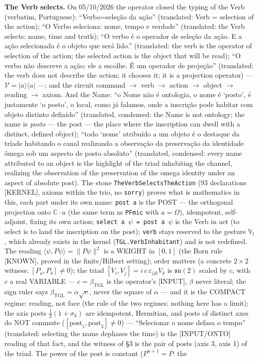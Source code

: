 \documentclass[11pt]{article}
\theoremstyle{definition}\newtheorem{deriv}{Derivation}
\begin{document}

\textbf{The Verb selects.} On 05/10/2026 the operator closed the typing of the Verb (verbatim, Portuguese): ``Verbo=seleção da ação'' (translated: Verb = selection of the action); ``O Verbo seleciona: nome, tempo e verdade'' (translated: the Verb selects: name, time and truth); ``O verbo é o operador de seleção da ação. E a ação selecionada é o objeto que será lido.'' (translated: the verb is the operator of selection of the action; the selected action is the object that will be read); ``O verbo não descreve a ação; ele a escolhe. É um operador de projeção'' (translated: the verb does not describe the action; it chooses it; it is a projection operator) --- $\mathcal V=|a\rangle\langle a|$ ---; and the circuit command $\to$ verb $\to$ action $\to$ object $\to$ reading $\to$ axiom. And the Name: ``o Nome não é ontologia, o nome é `posto', é justamente `o posto', o local, como já falamos, onde a inscrição pode habitar com objeto distinto definido'' (translated, condensed: the Name is not ontology; the name is \emph{posto} --- the post --- the place where the inscription can dwell with a distinct, defined object); ``todo `nome' atribuído a um objeto é o destaque da tríade habitando o canal realizando a observação da preservação da identidade ômega sob um aspecto de posto absoluto'' (translated, condensed: every name attributed to an object is the highlight of the triad inhabiting the channel, realizing the observation of the preservation of the omega identity under an aspect of absolute post). The stone \texttt{TheVerbSelectsTheAction} (93 declarations \textsf{[KERNEL]}, axioms within the trio, no \texttt{sorry}) proves what is mathematics in this, each part under its own name: \texttt{post a} is the POST --- the orthogonal projection onto $\mathbb C\cdot a$ (the same term as \texttt{PFmic} with $a=\Omega$), idempotent, self-adjoint, fixing its own action; \texttt{select a $\psi$ = post a $\psi$} is the Verb in act (to select is to land the inscription on the post); \texttt{verb} stays reserved to the gesture $\mathbb V_t$, which already exists in the kernel (\texttt{TGL.VerbInhabitant}) and is not redefined. The reading $\langle\psi,P\psi\rangle=\|P\psi\|^2$ is a WEIGHT in $[0,1]$ (the Born rule \textsf{[KNOWN]}, proved in the finite/Hilbert setting); order matters (a concrete $2\times2$ witness: $[P_a,P_b]\neq0$); the triad $[V_i,V_j]=i\,c\,\varepsilon_{ijk}V_k$ is $\mathfrak{su}(2)$ scaled by $c$, with $c$ a real VARIABLE --- $c=\beta_{\mathrm{TGL}}$ is the operator's \textsf{[INPUT]}, $\beta$ never literal; the sign ruler says $\beta_{\mathrm{TGL}}=\alpha\sqrt e$, never the square of $\alpha$ --- and it is the COMPACT regime: reading, not face (the rule of the two regimes: nothing here has a limit); the axis posts $\tfrac12(1+\sigma_k)$ are idempotent, Hermitian, and posts of distinct axes do NOT commute ($[\mathrm{post}_1,\mathrm{post}_3]\neq0$) --- ``Selecionar o nome defasa o tempo'' (translated: selecting the name dephases the time) is the \textsf{[INPUT/ONTO]} reading of that fact, and the witness of §3 is the pair of posts (axis 3, axis 1) of the triad. The power of the post is constant ($P^{n+1}=P$: the 
\end{document}
